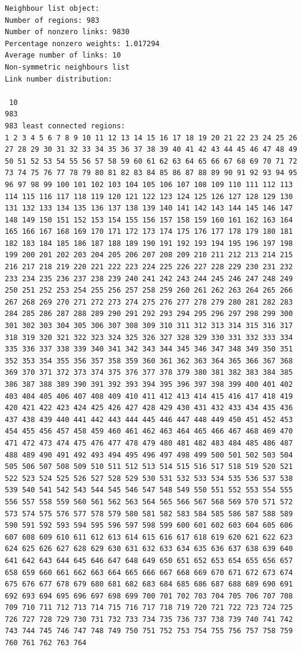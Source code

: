 \documentclass[
  letterpaper,
]{scrbook}
\begin{document}
\begin{verbatim}
Neighbour list object:
Number of regions: 983 
Number of nonzero links: 9830 
Percentage nonzero weights: 1.017294 
Average number of links: 10 
Non-symmetric neighbours list
Link number distribution:

 10 
983 
983 least connected regions:
1 2 3 4 5 6 7 8 9 10 11 12 13 14 15 16 17 18 19 20 21 22 23 24 25 26 27 28 29 30 31 32 33 34 35 36 37 38 39 40 41 42 43 44 45 46 47 48 49 50 51 52 53 54 55 56 57 58 59 60 61 62 63 64 65 66 67 68 69 70 71 72 73 74 75 76 77 78 79 80 81 82 83 84 85 86 87 88 89 90 91 92 93 94 95 96 97 98 99 100 101 102 103 104 105 106 107 108 109 110 111 112 113 114 115 116 117 118 119 120 121 122 123 124 125 126 127 128 129 130 131 132 133 134 135 136 137 138 139 140 141 142 143 144 145 146 147 148 149 150 151 152 153 154 155 156 157 158 159 160 161 162 163 164 165 166 167 168 169 170 171 172 173 174 175 176 177 178 179 180 181 182 183 184 185 186 187 188 189 190 191 192 193 194 195 196 197 198 199 200 201 202 203 204 205 206 207 208 209 210 211 212 213 214 215 216 217 218 219 220 221 222 223 224 225 226 227 228 229 230 231 232 233 234 235 236 237 238 239 240 241 242 243 244 245 246 247 248 249 250 251 252 253 254 255 256 257 258 259 260 261 262 263 264 265 266 267 268 269 270 271 272 273 274 275 276 277 278 279 280 281 282 283 284 285 286 287 288 289 290 291 292 293 294 295 296 297 298 299 300 301 302 303 304 305 306 307 308 309 310 311 312 313 314 315 316 317 318 319 320 321 322 323 324 325 326 327 328 329 330 331 332 333 334 335 336 337 338 339 340 341 342 343 344 345 346 347 348 349 350 351 352 353 354 355 356 357 358 359 360 361 362 363 364 365 366 367 368 369 370 371 372 373 374 375 376 377 378 379 380 381 382 383 384 385 386 387 388 389 390 391 392 393 394 395 396 397 398 399 400 401 402 403 404 405 406 407 408 409 410 411 412 413 414 415 416 417 418 419 420 421 422 423 424 425 426 427 428 429 430 431 432 433 434 435 436 437 438 439 440 441 442 443 444 445 446 447 448 449 450 451 452 453 454 455 456 457 458 459 460 461 462 463 464 465 466 467 468 469 470 471 472 473 474 475 476 477 478 479 480 481 482 483 484 485 486 487 488 489 490 491 492 493 494 495 496 497 498 499 500 501 502 503 504 505 506 507 508 509 510 511 512 513 514 515 516 517 518 519 520 521 522 523 524 525 526 527 528 529 530 531 532 533 534 535 536 537 538 539 540 541 542 543 544 545 546 547 548 549 550 551 552 553 554 555 556 557 558 559 560 561 562 563 564 565 566 567 568 569 570 571 572 573 574 575 576 577 578 579 580 581 582 583 584 585 586 587 588 589 590 591 592 593 594 595 596 597 598 599 600 601 602 603 604 605 606 607 608 609 610 611 612 613 614 615 616 617 618 619 620 621 622 623 624 625 626 627 628 629 630 631 632 633 634 635 636 637 638 639 640 641 642 643 644 645 646 647 648 649 650 651 652 653 654 655 656 657 658 659 660 661 662 663 664 665 666 667 668 669 670 671 672 673 674 675 676 677 678 679 680 681 682 683 684 685 686 687 688 689 690 691 692 693 694 695 696 697 698 699 700 701 702 703 704 705 706 707 708 709 710 711 712 713 714 715 716 717 718 719 720 721 722 723 724 725 726 727 728 729 730 731 732 733 734 735 736 737 738 739 740 741 742 743 744 745 746 747 748 749 750 751 752 753 754 755 756 757 758 759 760 761 762 763 764 
\end{verbatim}
\end{document}
